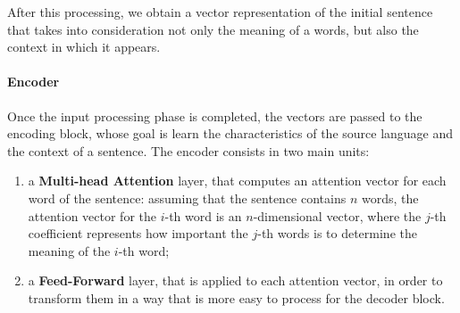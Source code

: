 \documentclass[12pt,a4paper]{book}
\theoremstyle{definition}
\begin{document}
	After this processing, we obtain a vector representation of the initial sentence that takes into consideration not only the meaning of a words, but also the context in which it appears.
	\paragraph{Encoder}
	Once the input processing phase is completed, the vectors are passed to the encoding block, whose goal is learn the characteristics of the source language and the context of a sentence. The encoder consists in two main units:
	\begin{enumerate}
		\item a \textbf{Multi-head Attention} layer, that computes an attention vector for each word of the sentence: assuming that the sentence contains $n$ words, the attention vector for the $i$-th word is an $n$-dimensional vector, where the $j$-th coefficient represents how important the $j$-th words is to determine the meaning of the $i$-th word;
		\item a \textbf{Feed-Forward} layer, that is applied to each attention vector, in order to transform them in a way that is more easy to process for the decoder block.
	\end{enumerate} 
	
\end{document}
